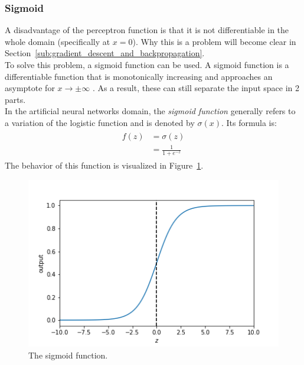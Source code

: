 \subsubsection{Sigmoid} %
\label{ssub:sigmoid}
A disadvantage of the perceptron function is that it is not differentiable in the whole domain (specifically at $x=0$). Why this is a problem will become clear in Section~\ref{sub:gradient_descent_and_backpropagation}.\\
To solve this problem, a sigmoid function can be used. A sigmoid function is a differentiable function that is monotonically increasing and approaches an asymptote for $x \to \pm\infty$ \citep{series/lncs/LeCunBOM12}. As a result, these can still separate the input space in 2 parts.\\
In the artificial neural networks domain, the \textit{sigmoid function} generally refers to a variation of the logistic function and is denoted by $\sigma(x)$. Its formula is:
\begin{align}
    \begin{split}
        f(z) &= \sigma(z)\\
        &= \frac{1}{1+e^{-z}}
    \end{split}
\end{align}
The behavior of this function is visualized in Figure~\ref{fig:sigmoid}.
\begin{figure}[htb]
    \centering
    \includegraphics[width=.8\linewidth]{images/activation_functions/sigmoid.png}
    \caption[The sigmoid function]{The sigmoid function.}
    \label{fig:sigmoid}
\end{figure}

